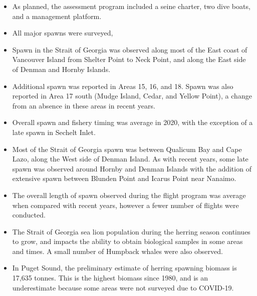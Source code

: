 \begin{itemize}

\item As planned, the assessment program included a seine charter, two dive boats, and a management platform.

\item All major spawns were surveyed, 

\item Spawn in the Strait of Georgia was observed along most of the East coast of Vancouver Island from Shelter Point to Neck Point, and along the East side of Denman and Hornby Islands.

\item Additional spawn was reported in Areas 15, 16, and 18.
Spawn was also reported in Area 17 south (Mudge Island, Cedar, and Yellow Point), a change from an absence in these areas in recent years.

\item Overall spawn and fishery timing was average in 2020, with the exception of a late spawn in Sechelt Inlet.

\item Most of the Strait of Georgia spawn was between Qualicum Bay and Cape Lazo, along the West side of Denman Island.
As with recent years, some late spawn was observed around Hornby and Denman Islands with the addition of extensive spawn between Blunden Point and Icarus Point near Nanaimo.

\item The overall length of spawn observed during the flight program was average when compared with recent years, however a fewer number of flights were conducted.

\item The Strait of Georgia sea lion population during the herring season continues to grow, and impacts the ability to obtain biological samples in some areas and times.
A small number of Humpback whales were also observed.

\item In Puget Sound, the preliminary estimate of herring spawning biomass is 17,635 tonnes.
This is the highest biomass since 1980, and is an underestimate because some areas were not surveyed due to COVID-19.

\end{itemize}
